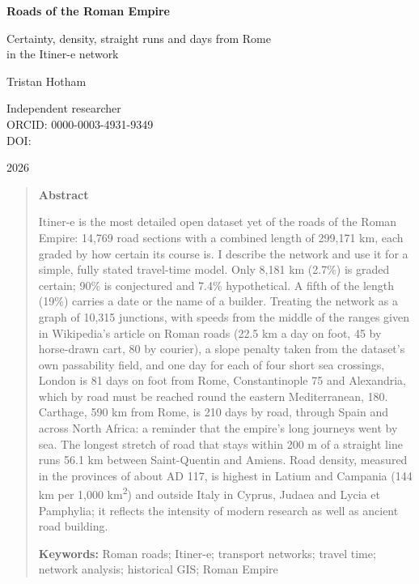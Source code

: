 \documentclass[11pt,a4paper]{article}
\begin{document}
\begin{center}
{\Large\bfseries Roads of the Roman Empire\par}
\vspace{0.4em}
{\large Certainty, density, straight runs and days from Rome\\in the Itiner-e network\par}
\vspace{1.2em}
{\large Tristan Hotham\par}
\vspace{0.3em}
{\small Independent researcher\\
ORCID: 0000-0003-4931-9349\\
DOI: \par}
\vspace{0.8em}
2026
\end{center}

\begin{quote}
\small
\begin{center}\textbf{Abstract}\end{center}
Itiner-e is the most detailed open dataset yet of the roads of the Roman Empire: 14,769 road sections with a combined length of 299,171 km, each graded by how certain its course is. I describe the network and use it for a simple, fully stated travel-time model. Only 8,181 km (2.7\%) is graded certain; 90\% is conjectured and 7.4\% hypothetical. A fifth of the length (19\%) carries a date or the name of a builder. Treating the network as a graph of 10,315 junctions, with speeds from the middle of the ranges given in Wikipedia's article on Roman roads (22.5 km a day on foot, 45 by horse-drawn cart, 80 by courier), a slope penalty taken from the dataset's own passability field, and one day for each of four short sea crossings, London is 81 days on foot from Rome, Constantinople 75 and Alexandria, which by road must be reached round the eastern Mediterranean, 180. Carthage, 590 km from Rome, is 210 days by road, through Spain and across North Africa: a reminder that the empire's long journeys went by sea. The longest stretch of road that stays within 200 m of a straight line runs 56.1 km between Saint-Quentin and Amiens. Road density, measured in the provinces of about AD 117, is highest in Latium and Campania (144 km per 1,000 km\textsuperscript{2}) and outside Italy in Cyprus, Judaea and Lycia et Pamphylia; it reflects the intensity of modern research as well as ancient road building.

\textbf{Keywords:} Roman roads; Itiner-e; transport networks; travel time; network analysis; historical GIS; Roman Empire
\end{quote}
\end{document}
